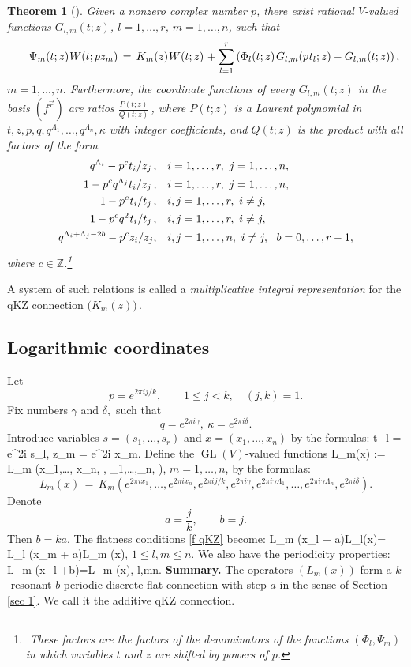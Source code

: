 \documentclass[12pt]{amsart}
\def\>{\relax\ifmmode\mskip.666667\thinmuskip\relax\else\kern.111111em\fi}
\def\<{\relax\ifmmode\mskip-.333333\thinmuskip\relax\else\kern-.0555556em\fi}
\newtheorem{thm}{Theorem}[section]
\theoremstyle{definition} %
\numberwithin{equation}{section}
\theoremstyle{definition}
\let\ka\kappa
\let\La\Lambda
\let\leq\leqslant
\let\on\operatorname
\def\Z{{\mathbb Z}}
\def\beq{\begin{equation}}
\def\eeq{\end{equation}}
\def\be{\begin{equation*}}
\def\ee{\end{equation*}}
\let\ga\gamma
\begin{document}
\begin{thm} [\cite{TV1, TV2}]
\label{thm 7.4}
Given a nonzero complex number $p$,
there exist rational $V$-valued functions
$G_{l,m}(t;z)$, $l=1, \dots, r$, $m=1,\dots,n$, such that
\beq
\label{mIR}
\phantom{aaa}
\Psi_m(t;z)\<\>W(t;pz_m)\,=\,K_m(z)\<\>W(t;z)\>+
\sum_{l=1}^r \left(\Phi_l(t;z)\>G_{l,m}(p\<\>t_l;z) -G_{l,m}(t;z)\right),
\eeq
$m=1,\dots,n$.
Furthermore, the coordinate functions of every $G_{l,m}(t;z)$ in the basis $(f^{\vec r})$
are ratios
$\frac{P(t;z)}{Q(t;z)}$\,,
where $P(t;z)$ is a Laurent polynomial in $t, z, p, q, q^{\La_1},\dots,q^{\La_n}, \ka $
with integer coefficients,
and $Q(t;z)$ is the product with all factors of the form
\begin{align*}
q^{\Lambda_i}-p^ct_i/z_j\,, &\quad i = 1,\dots, r, \ j=1,\dots,n,
\\
1-p^cq^{\La_j}t_i/z_j\,, &\quad i = 1,\dots, r, \ j=1,\dots,n,
\\
1-p^c\<\>t_i/t_j \,, & \quad i,j = 1,\dots, r, \ i\ne j,
\\
1-p^cq^{2}\<\>t_i/t_j\,, &\quad i,j = 1,\dots, r, \ i\ne j,
\\
q^{\La_i+\La_j-2b} - p^c z_i/z_j, &\quad
i,j=1,\dots,n, \ i\ne j, \ \ b=0,\dots,r-1,
\end{align*}
where $c\in\Z$.\footnote{${}$ These factors are
the factors of the denominators of the functions
$(\Phi_l, \Psi_m)$ in which variables $t$ and $z$ are shifted by powers of $p$.}

\end{thm}

A system of such relations is called a {\it multiplicative integral representation} for
the qKZ connection $\bigl(K_m(z)\bigr)$\,.

\subsection{Logarithmic coordinates}
\label{sec 3.6}

Let
\be
p=e^{2\pi i j/k}, \qquad 1\leq j< k, \quad (j,k)=1.
\ee
Fix numbers $\ga$ and $\delta, $ such that
\beq
\label{log coo}
q= e^{2\pi i \ga}, \
\ka = e^{2\pi i \delta}.
\eeq
Introduce variables $s=(s_1,\dots,s_r)$ and $x=(x_1,\dots,x_n)$ by the formulas:
\bean
\label{log tz}
t_l = e^{2\pi i s_l}, \qquad
z_m = e^{2\pi i x_m}.
\eean
Define the
$\on{GL}(V)$-valued functions
\bea
L_m(x) := L_m
(x_1,\dots, x_n, \ga, \La_1,\dots,\La_n, \ka),
\eea
$m=1,\dots,n$,
by the formulas:
\beq
\label{qkz log}
L_m(x)\,=\,
K_m(e^{2\pi i x_1},\dots, e^{2\pi i x_n}, e^{2\pi i j/k}, e^{2\pi i \ga},
e^{2\pi i \ga \La_1}, \dots, e^{2\pi i \ga \La_n}, e^{2\pi i \delta}).
\eeq
Denote
\be
a=\frac jk, \qquad b= j.
\ee
Then $b=ka$.
The flatness conditions \eqref{f qKZ} become:
\bean
\label{f qkz}
L_m
(x_l + a)L_l(x)=
L_l
(x_m + a)L_m
(x),
\eean
$ 1\leq l,m\leq n$.
We also have the periodicity properties:
\bean
\label{p qkz}
L_m
(x_l +b)=L_m
(x), \leq l,m\leq n.
\eean
{\bf Summary.} The operators $(L_m
(x))$ form a $k$-resonant
$b$-periodic discrete flat connection with step $a$ in the sense of Section \ref{sec 1}.
We call it the additive qKZ connection.
\end{document}

